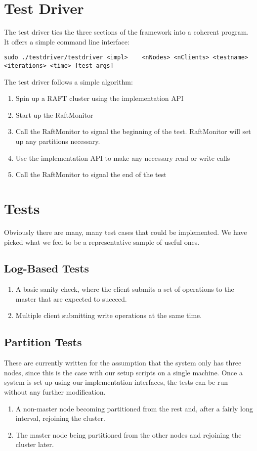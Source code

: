 \documentclass[UTF8]{article}
\begin{document}
\section{Test Driver}
The test driver ties the three sections of the framework into a coherent program. It offers a simple command line interface:
\begin{lstlisting}
sudo ./testdriver/testdriver <impl>    <nNodes> <nClients> <testname>  <iterations> <time> [test args]
\end{lstlisting}
The test driver follows a simple algorithm:
\begin{enumerate}
  \item Spin up a RAFT cluster using the implementation API
  \item Start up the RaftMonitor
  \item Call the RaftMonitor to signal the beginning of the test. RaftMonitor will set up any partitions necessary.
  \item Use the implementation API to make any necessary read or write calls
  \item Call the RaftMonitor to signal the end of the test
\end{enumerate}

\section{Tests}
Obviously there are many, many test cases that could be implemented. We have picked what we feel to be a representative sample of useful ones.
\subsection{Log-Based Tests}
\begin{enumerate}
  \item A basic sanity check, where the client submits a set of operations to the master that are expected to succeed.
  \item Multiple client submitting write operations at the same time.
\end{enumerate}
\subsection{Partition Tests}
These are currently written for the assumption that the system only has three nodes, since this is the case with our setup scripts on a single machine. Once a system is set up using our implementation interfaces, the tests can be run without any further modification. 
\begin{enumerate}
  \item A non-master node becoming partitioned from the rest and, after a fairly long interval, rejoining the cluster.
  \item The master node being partitioned from the other nodes and rejoining the cluster later.
\end{enumerate}
\end{document}
